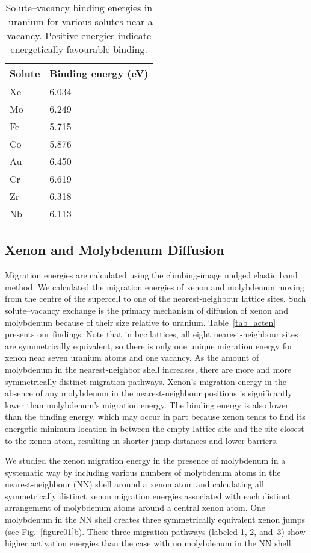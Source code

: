 \begin{table}
    \centering
    \caption{Solute--vacancy binding energies in \textgamma-uranium for
        various solutes near a vacancy.
        Positive energies indicate energetically-favourable binding.}
    \label{tab_solvac}
    \begin{tabular}{l l}
      \toprule
        Solute & Binding energy (eV) \\
      \midrule
        Xe & 6.034 \\
        Mo & 6.249 \\
        Fe & 5.715 \\
        Co & 5.876 \\
        Au & 6.450 \\
        Cr & 6.619 \\
        Zr & 6.318 \\
        Nb & 6.113 \\
      \bottomrule
    \end{tabular}
\end{table}

\subsection{Xenon and Molybdenum Diffusion}
Migration energies are calculated using the climbing-image nudged elastic band
method. We calculated the migration energies of xenon and molybdenum moving
from the centre of the supercell to one of the nearest-neighbour lattice sites.
Such solute--vacancy exchange is the primary mechanism of diffusion of xenon
and molybdenum because of their size relative to uranium.
Table~\ref{tab_acten} presents our findings.
Note that in bcc lattices, all eight nearest-neighbour sites are symmetrically
equivalent, so there is only one unique migration energy for xenon near seven
uranium atoms and one vacancy.
As the amount of molybdenum in the nearest-neighbor shell increases,
there are more and more symmetrically distinct migration pathways.
Xenon's migration energy in the absence of any molybdenum in the
nearest-neighbour positions is significantly lower than molybdenum's migration
energy.
The  binding energy is also lower than the  binding
energy, which may occur in part because xenon tends to find its energetic
minimum location in between the empty lattice site and the site closest to the
xenon atom, resulting in shorter jump distances and lower barriers. 

We studied the xenon migration energy in the presence of molybdenum in a
systematic way by including various numbers of molybdenum atoms in the
nearest-neighbour (NN) shell around a xenon atom and calculating all
symmetrically distinct xenon migration energies associated with each distinct
arrangement of molybdenum atoms around a central xenon atom.
One molybdenum in the NN shell creates three symmetrically equivalent xenon
jumps (see Fig.~\ref{figure01}b). These three migration pathways (labeled 1, 2,
and~3) show higher activation energies than the case with no molybdenum in the
NN shell.

